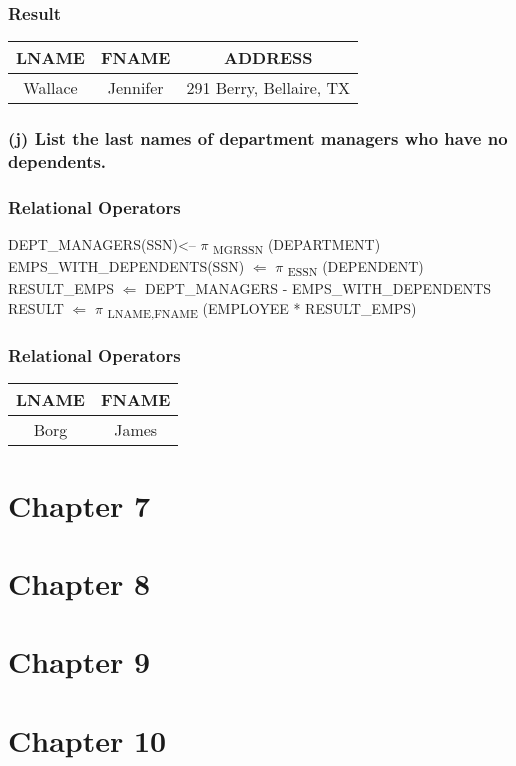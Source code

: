 \documentclass[11pt, oneside]{article}   	%
\begin{document}
\subsubsection*{Result}
\begin{center}
\begin{tabular}{ c | c | c}
  LNAME & FNAME  & ADDRESS \\ \hline
  Wallace & Jennifer & 291 Berry, Bellaire, TX \\
\end{tabular}
\end{center}

\subsubsection*{(j) List the last names of department managers who have no dependents.}
\subsubsection*{Relational Operators}
DEPT\_MANAGERS(SSN)<-- $\pi$ \textsubscript{MGRSSN} (DEPARTMENT) \\
EMPS\_WITH\_DEPENDENTS(SSN) $\Leftarrow$ $\pi$ \textsubscript{ESSN} (DEPENDENT) \\
RESULT\_EMPS $\Leftarrow$ DEPT\_MANAGERS - EMPS\_WITH\_DEPENDENTS \\
RESULT $\Leftarrow$ $\pi$ \textsubscript{LNAME,FNAME} (EMPLOYEE * RESULT\_EMPS)

\subsubsection*{Relational Operators}
\begin{center}
\begin{tabular}{ c | c }
  LNAME & FNAME \\ \hline
  Borg & James \\
\end{tabular}
\end{center}

\section*{Chapter 7}
\section*{Chapter 8}
\section*{Chapter 9}
\section*{Chapter 10}
\end{document}
